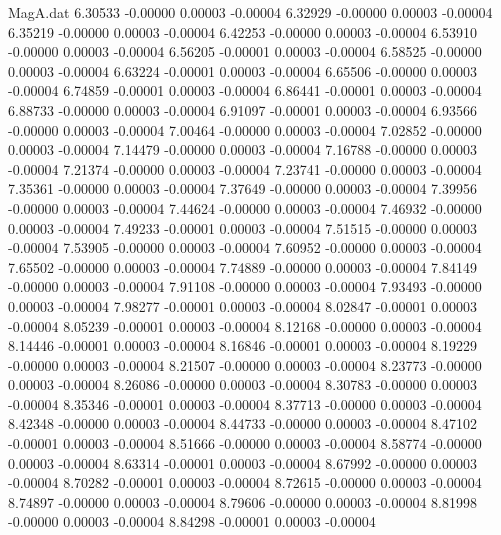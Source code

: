 \begin{filecontents}{MagA.dat}
   6.30533   -0.00000    0.00003   -0.00004
   6.32929   -0.00000    0.00003   -0.00004
   6.35219   -0.00000    0.00003   -0.00004
   6.42253   -0.00000    0.00003   -0.00004
   6.53910   -0.00000    0.00003   -0.00004
   6.56205   -0.00001    0.00003   -0.00004
   6.58525   -0.00000    0.00003   -0.00004
   6.63224   -0.00001    0.00003   -0.00004
   6.65506   -0.00000    0.00003   -0.00004
   6.74859   -0.00001    0.00003   -0.00004
   6.86441   -0.00001    0.00003   -0.00004
   6.88733   -0.00000    0.00003   -0.00004
   6.91097   -0.00001    0.00003   -0.00004
   6.93566   -0.00000    0.00003   -0.00004
   7.00464   -0.00000    0.00003   -0.00004
   7.02852   -0.00000    0.00003   -0.00004
   7.14479   -0.00000    0.00003   -0.00004
   7.16788   -0.00000    0.00003   -0.00004
   7.21374   -0.00000    0.00003   -0.00004
   7.23741   -0.00000    0.00003   -0.00004
   7.35361   -0.00000    0.00003   -0.00004
   7.37649   -0.00000    0.00003   -0.00004
   7.39956   -0.00000    0.00003   -0.00004
   7.44624   -0.00000    0.00003   -0.00004
   7.46932   -0.00000    0.00003   -0.00004
   7.49233   -0.00001    0.00003   -0.00004
   7.51515   -0.00000    0.00003   -0.00004
   7.53905   -0.00000    0.00003   -0.00004
   7.60952   -0.00000    0.00003   -0.00004
   7.65502   -0.00000    0.00003   -0.00004
   7.74889   -0.00000    0.00003   -0.00004
   7.84149   -0.00000    0.00003   -0.00004
   7.91108   -0.00000    0.00003   -0.00004
   7.93493   -0.00000    0.00003   -0.00004
   7.98277   -0.00001    0.00003   -0.00004
   8.02847   -0.00001    0.00003   -0.00004
   8.05239   -0.00001    0.00003   -0.00004
   8.12168   -0.00000    0.00003   -0.00004
   8.14446   -0.00001    0.00003   -0.00004
   8.16846   -0.00001    0.00003   -0.00004
   8.19229   -0.00000    0.00003   -0.00004
   8.21507   -0.00000    0.00003   -0.00004
   8.23773   -0.00000    0.00003   -0.00004
   8.26086   -0.00000    0.00003   -0.00004
   8.30783   -0.00000    0.00003   -0.00004
   8.35346   -0.00001    0.00003   -0.00004
   8.37713   -0.00000    0.00003   -0.00004
   8.42348   -0.00000    0.00003   -0.00004
   8.44733   -0.00000    0.00003   -0.00004
   8.47102   -0.00001    0.00003   -0.00004
   8.51666   -0.00000    0.00003   -0.00004
   8.58774   -0.00000    0.00003   -0.00004
   8.63314   -0.00001    0.00003   -0.00004
   8.67992   -0.00000    0.00003   -0.00004
   8.70282   -0.00001    0.00003   -0.00004
   8.72615   -0.00000    0.00003   -0.00004
   8.74897   -0.00000    0.00003   -0.00004
   8.79606   -0.00000    0.00003   -0.00004
   8.81998   -0.00000    0.00003   -0.00004
   8.84298   -0.00001    0.00003   -0.00004

\end{filecontents}
